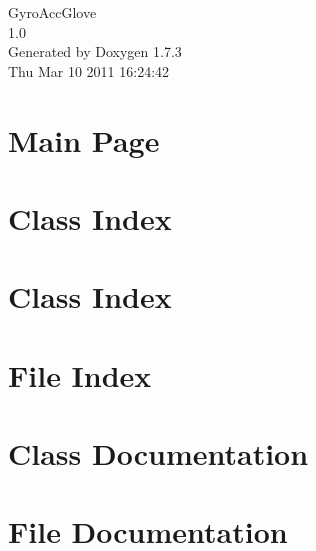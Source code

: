 \documentclass[a4paper]{book}
\begin{document}
\hypersetup{pageanchor=false}
\begin{titlepage}
\vspace*{7cm}
\begin{center}
{\Large GyroAccGlove \\[1ex]\large 1.0 }\\
\vspace*{1cm}
{\large Generated by Doxygen 1.7.3}\\
\vspace*{0.5cm}
{\small Thu Mar 10 2011 16:24:42}\\
\end{center}
\end{titlepage}
\clearemptydoublepage
{}
\tableofcontents
\clearemptydoublepage
{}
\hypersetup{pageanchor=true}
\chapter{Main Page}
\label{index}\hypertarget{index}{}
\chapter{Class Index}

\chapter{Class Index}

\chapter{File Index}

\chapter{Class Documentation}












\chapter{File Documentation}























\printindex
\end{document}
